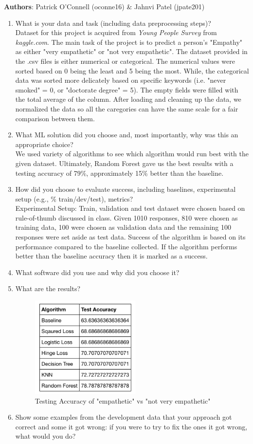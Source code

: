 \documentclass[8pt]{report}
\begin{document}
\textbf{Authors}: Patrick O'Connell (oconne16) \& Jahnvi Patel (jpate201)
\begin{enumerate}
\item What is your data and task (including data preprocessing steps)? \\
Dataset for this project is acquired from \textit{Young People Survey} from \textit{kaggle.com}. The main task of the project is to predict a person's "Empathy" as either "very empathetic" or "not very empathetic". The dataset provided in the .csv files is either numerical or categorical. The numerical values were sorted based on 0 being the least and 5 being the most. While, the categorical data was sorted more delicately based on specific keywords (i.e. "never smoked" = 0, or "doctorate degree" = 5). The empty fields were filled with the total average of the column. After loading and cleaning up the data, we normalized the data so all the caregories can have the same scale for a fair comparison between them. 

\item What ML solution did you choose and, most importantly, why was this an appropriate choice?\\
 We used variety of algorithms to see which algorithm would run best with the given dataset. Ultimately, Random Forest gave us the best results with a testing accuracy of 79\%, approximately 15\% better than the baseline. 

\item How did you choose to evaluate success, including baselines, experimental setup (e.g., \% train/dev/test), metrics?\\
Experimental Setup: Train, validation and test dataset were chosen based on rule-of-thumb discussed in class. Given 1010 responses, 810 were chosen as training data, 100 were chosen as validation data and the remaining 100 responses were set aside as test data. 
Success of the algorithm is based on its performance compared to the baseline collected. If the algorithm performs better than the baseline accuracy then it is marked as a success. 

\item What software did you use and why did you choose it?

\item What are the results?
\begin{figure}[h]
  \centering
  \includegraphics[height=2in]{results.png}
  \caption{Testing Accuracy of "empathetic" vs "not very empathetic"}
  \label{f:myplotfig}
\end{figure}

\item Show some examples from the development data that your approach got correct and some it got wrong: if you were to try to fix the ones it got wrong, what would you do?

\end{enumerate}
\end{document}

